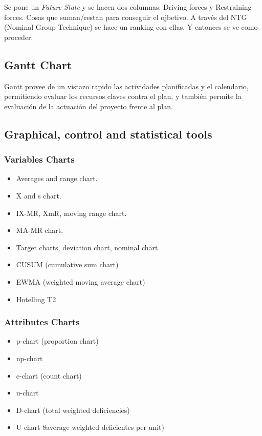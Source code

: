\documentclass[]{article}
\begin{document}
Se pone un \textit{Future State} y se hacen dos columnas: Driving forces y Restraining forces. Cosas que suman/restan para conseguir el ojbetivo. A través del NTG (Nominal Group Technique) se hace un ranking con ellas. Y entonces se ve como proceder.

\subsection{Gantt Chart}

Gantt provee de un vistazo rapido las actividades planificadas y el calendario, permitiendo evaluar los recursos claves contra el plan, y también permite la evaluación de la actuación del proyecto frente al plan.

\subsection{Graphical, control and statistical tools}

\subsubsection{Variables Charts}

\begin{itemize}
	\item Averages and range chart.
	\item X and s chart.
	\item IX-MR, XmR, moving range chart.
	\item MA-MR chart.
	\item Target charts, deviation chart, nominal chart.
	\item CUSUM (cumulative sum chart)
	\item EWMA (weighted moving average chart)
	\item Hotelling T2
\end{itemize}

\subsubsection{Attributes Charts}

\begin{itemize}
	\item p-chart (proportion chart)
	\item np-chart
	\item c-chart (count chart)
	\item u-chart
	\item D-chart (total weighted deficiencies)
	\item U-chart 8average weighted deficientes per unit)
\end{itemize}
\end{document}
